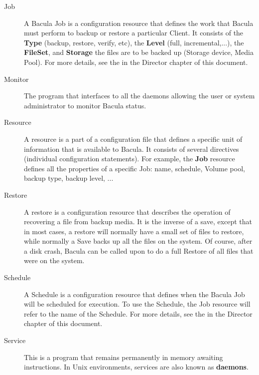 \begin{description}
\label{JobDef}
\item [Job]
   A Bacula Job is a configuration resource that defines the work that
   Bacula must perform to backup or restore a particular Client.  It
   consists of the {\bf Type} (backup, restore, verify, etc), the {\bf
   Level} (full, incremental,...), the {\bf FileSet}, and {\bf Storage} the
   files are to be backed up (Storage device, Media Pool).  For more
   details, see the  in the
   Director chapter of this document.

\item [Monitor]
   The program that interfaces to all the daemons  allowing the user or
   system administrator to monitor Bacula status. 

\item [Resource]
   A resource is a part of a configuration file that defines a specific
   unit of information that is available to Bacula.  It consists of several
   directives (individual configuration statements).  For example, the {\bf
   Job} resource defines all the properties of a specific Job: name,
   schedule, Volume pool, backup type, backup level, ...

\item [Restore]
   A restore is a configuration resource that describes the operation of
   recovering a file from backup media.  It is the inverse of a save,
   except that in most cases, a restore will normally have a small set of
   files to restore, while normally a Save backs up all the files on the
   system.  Of course, after a disk crash, Bacula can be called upon to do
   a full Restore of all files that were on the system.


\item [Schedule]
   A Schedule is a configuration resource that defines when the Bacula Job
   will be scheduled for execution.  To use the Schedule, the Job resource
   will refer to the name of the Schedule.  For more details, see the
    in the Director
   chapter of this document.

\item [Service]
   This is a program that remains permanently in memory awaiting
   instructions.  In Unix environments, services are also known as
   {\bf daemons}. 


\end{description}
